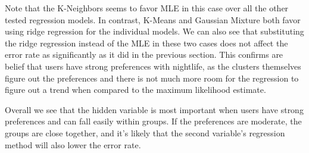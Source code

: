 \documentclass[11pt]{article}
\begin{document}
Note that the K-Neighbors seems to favor MLE in this case over all the other tested regression models. In contrast, K-Means and Gaussian Mixture both favor using ridge regression for the individual models. We can also see that substituting the ridge regression instead of the MLE in these two cases does not affect the error rate as significantly as it did in the previous section. This confirms are belief that users have strong preferences with nightlife, as the clusters themselves figure out the preferences and there is not much more room for the regression to figure out a trend when compared to the maximum likelihood estimate.

Overall we see that the hidden variable is most important when users have strong preferences and can fall easily within groups. If the preferences are moderate, the groups are close together, and it's likely that the second variable's regression method will also lower the error rate.

\clearpage

\end{document}
